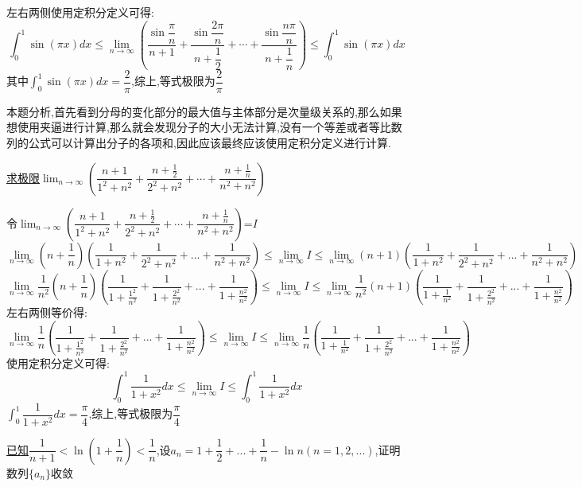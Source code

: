 \documentclass[8pt a4paper, oneside, UTF8]{ctexbook}
\begin{document}
\begin{sloppypar}
\begin{solution}
$$        $$
        左右两侧使用定积分定义可得:
        $$
            \int_0 ^1 \sin (\pi x) dx \leqslant \lim_{n\to\infty}\left(\dfrac{\sin\dfrac\pi n}{n+1}+\dfrac{\sin\dfrac{2\pi}n}{n+\dfrac12}+\cdots+\dfrac{\sin\dfrac{n\pi}n}{n+\dfrac1n}\right) \leqslant \int_0 ^1 \sin (\pi x) dx
        $$
        其中$\int_0 ^1 \sin (\pi x) dx=\dfrac{2}{\pi}$,综上,等式极限为$\dfrac{2}{\pi}$
    \end{solution}
    \begin{note}
        本题分析,首先看到分母的变化部分的最大值与主体部分是次量级关系的,那么如果想使用夹逼进行计算,那么就会发现分子的大小无法计算,没有一个等差或者等比数列的公式可以计算出分子的各项和,因此应该最终应该使用定积分定义进行计算.
    \end{note}
    \begin{problem}
    \uline{求极限}$\lim_{n\to\infty}\left(\dfrac{n+1}{1^{2}+n^{2}}+\dfrac{n+\frac{1}{2}}{2^{2}+n^{2}}+\cdots+\dfrac{n+\frac{1}{n}}{n^{2}+n^{2}}\right)$
    \end{problem}
    \begin{solution}
        令$\lim_{n\to\infty}\left(\dfrac{n+1}{1^{2}+n^{2}}+\dfrac{n+\frac{1}{2}}{2^{2}+n^{2}}+\cdots+\dfrac{n+\frac{1}{n}}{n^{2}+n^{2}}\right)$=$I$
        $$
            \lim_{n \to \infty} (n+\frac{1}{n})(\dfrac{1}{1+n^2}+\dfrac{1}{2^2+n^2}+...+\dfrac{1}{n^2+n^2}) \leqslant   \lim_{n\to \infty}I \leqslant \lim_{n \to \infty} (n+1)(\dfrac{1}{1+n^2}+\dfrac{1}{2^2+n^2}+...+\dfrac{1}{n^2+n^2})
        $$
        $$
            \lim_{n \to \infty} \dfrac{1}{n^2}(n+\frac{1}{n})(\dfrac{1}{1+\frac{1^2}{n^2}}+\dfrac{1}{1+\frac{2^2}{n^2}}+...+\dfrac{1}{1+\frac{n^2}{n^2}}) \leqslant \lim_{n\to \infty}I \leqslant \lim_{n \to \infty}\frac{1}{n^2} (n+1)(\dfrac{1}{1+\frac{1}{n^2}}+\dfrac{1}{1+\frac{2^2}{n^2}}+...+\dfrac{1}{1+\frac{n^2}{n^2}})
        $$
        左右两侧等价得:
        $$
            \lim_{n \to \infty} \dfrac{1}{n}(\dfrac{1}{1+\frac{1^2}{n^2}}+\dfrac{1}{1+\frac{2^2}{n^2}}+...+\dfrac{1}{1+\frac{n^2}{n^2}}) \leqslant \lim_{n\to \infty} I \leqslant \lim_{n \to \infty}\frac{1}{n}(\dfrac{1}{1+\frac{1}{n^2}}+\dfrac{1}{1+\frac{2^2}{n^2}}+...+\dfrac{1}{1+\frac{n^2}{n^2}})
        $$
        使用定积分定义可得:
        $$
            \int_0 ^1 \dfrac{1}{1+x^2}dx \leqslant \lim_{n\to \infty} I \leqslant \int_0^1 \dfrac{1}{1+x^2}dx
        $$
        $\int_0 ^1 \dfrac{1}{1+x^2}dx=\dfrac{\pi}{4}$,综上,等式极限为$\dfrac{\pi}{4}$
    \end{solution}
    \begin{problem}
    \uline{已知}$\dfrac1{n+1}<\ln(1+\dfrac1n)<\dfrac1n$,设$a_n=1+\dfrac12+...+\dfrac1n-\ln n(n=1,2,...)$,证明数列$\{a_n\}$收敛

\end{problem}
\end{sloppypar}
\end{document}
